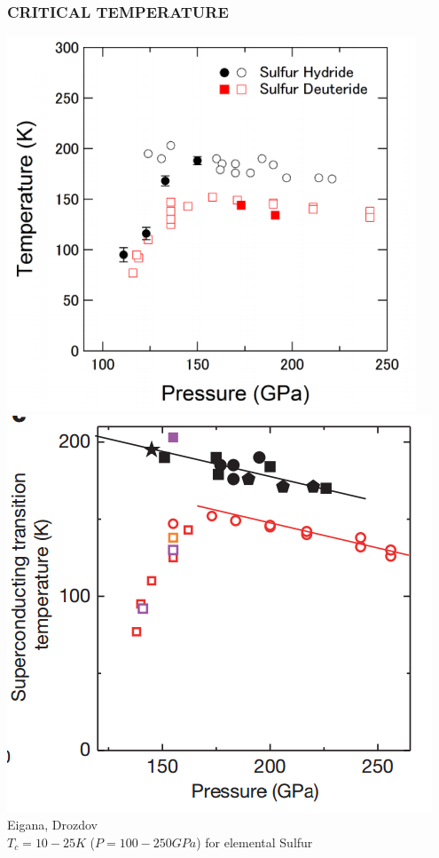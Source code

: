 \documentclass[amssymb,amsmath]{beamer}
\begin{document}
\begin{frame}
\frametitle{CRITICAL TEMPERATURE}
\centering

\includegraphics[scale=0.3]{./figures/PT_einaga.png}
\includegraphics[scale=0.3]{./figures/PT_drozdov.png}\\
Eigana, Drozdov \\[1cm]
$T_c=10-25K$ ($P=100-250GPa$) for elemental Sulfur  
\end{frame}
\end{document}
